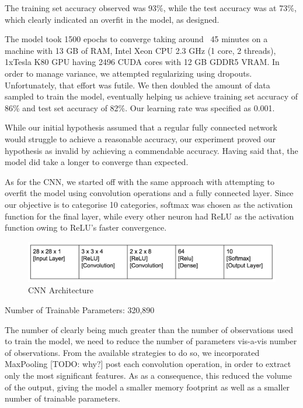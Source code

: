 \documentclass[12pt]{article}
\begin{document}
The training set accuracy observed was 93\%, while the test accuracy was at
73\%, which clearly indicated an overfit in the model, as designed.

The model took 1500 epochs to converge taking around ~45 minutes on a
machine with 13 GB of RAM, Intel Xeon CPU 2.3 GHz (1 core, 2 threads),
1xTesla K80 GPU having 2496 CUDA cores with 12 GB GDDR5 VRAM. In order to
manage variance, we attempted regularizing using dropouts. Unfortunately,
that effort was futile. We then doubled the amount of data sampled to train
the model, eventually helping us achieve training set accuracy of 86\% and
test set accuracy of 82\%. Our learning rate was specified as 0.001.

While our initial hypothesis assumed that a regular fully connected network
would struggle to achieve a reasonable accuracy, our experiment proved our
hypothesis as invalid by achieving a commendable accuracy. Having said that,
the model did take a longer to converge than expected.

As for the CNN, we started off with the same approach with attempting to
overfit the model using convolution operations and a fully connected layer.
Since our objective is to categorise 10 categories, softmax was chosen as the
activation function for the final layer, while every other neuron had ReLU as
the activation function owing to ReLU’s faster convergence.

\begin{figure}
  \begin{center}
    \includegraphics[scale=0.5]{fig3}
    \end{center}
  \caption{CNN Architecture}
  \label{fig:cnnArch}
\end{figure}



Number of Trainable Parameters: 320,890


The number of clearly being much greater than the number of observations used
to train the model, we need to reduce the number of parameters vis-a-vis
number of observations. From the available strategies to do so, we
incorporated MaxPooling [TODO: why?] post each convolution operation, in
order to extract only the most significant features. As as a consequence,
this reduced the volume of the output, giving the model a smaller memory
footprint as well as a smaller number of trainable parameters.
\end{document}

